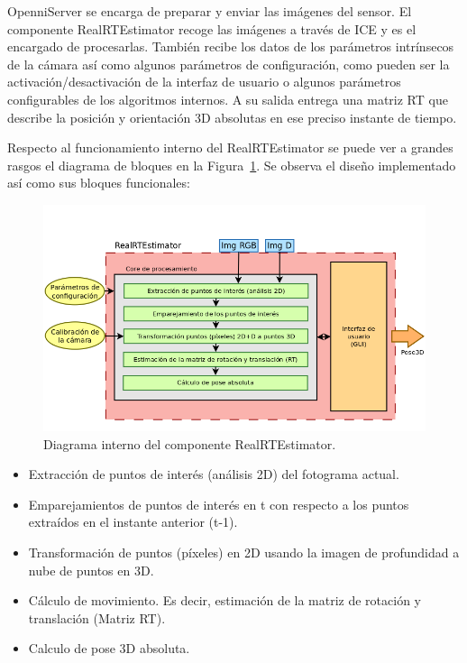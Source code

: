 OpenniServer se encarga de preparar y enviar las imágenes del sensor. El componente RealRTEstimator recoge las imágenes a través de ICE y es el encargado de procesarlas. También recibe los datos de los parámetros intrínsecos de la cámara así como algunos parámetros de configuración, como pueden ser la activación/desactivación de la interfaz de usuario o algunos parámetros configurables de los algoritmos internos. A su salida entrega una matriz RT que describe la posición y orientación 3D absolutas en ese preciso instante de tiempo. 

Respecto al funcionamiento interno del RealRTEstimator se puede ver a grandes rasgos el diagrama de bloques en la Figura~\ref{fig:diagram2}. Se observa el diseño implementado así como sus bloques funcionales:

\begin{figure}[!ht]
\centering
\includegraphics[scale=0.36]{Figures/diagram2.png}
\decoRule
\caption[Diagrama interno del componente RealRTEstimator]{Diagrama interno del componente RealRTEstimator.}
\label{fig:diagram2}
\end{figure}

\begin{itemize}
\item Extracción de puntos de interés (análisis 2D) del fotograma actual.

\item Emparejamientos de puntos de interés en t con respecto a los puntos extraídos en el instante anterior (t-1).

\item Transformación de puntos (píxeles) en 2D usando la imagen de profundidad a nube de puntos en 3D.

\item Cálculo de movimiento. Es decir, estimación de la matriz de rotación y translación (Matriz RT).

\item Calculo de pose 3D absoluta.

\end{itemize}

